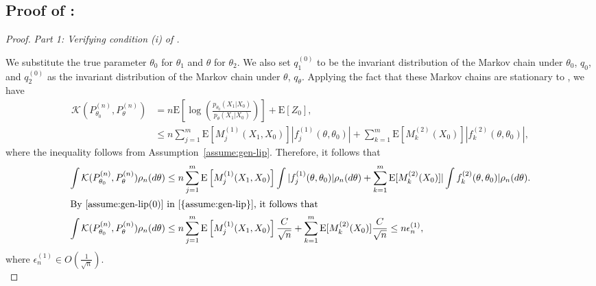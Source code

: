 \documentclass[11pt]{amsart}
\newcommand{\E}{\mathrm{E}}
\newcommand{\kld}{ \mathcal{K}(P^{(n)}_{\theta_0},P^{(n)}_{\theta})}
\begin{document}
\subsection{Proof of  : }
%
\begin{proof} 
\textit{Part 1: Verifying condition (i) of .}

We substitute the true parameter $\theta_0$  for $\theta_1$ and $\theta$ for $\theta_2$. 
We also set $q_{1}^{(0)}$ to be the invariant distribution of the Markov chain under $\theta_0$, $q_{0}$, and $q_{2}^{(0)}$ as the invariant distribution of the Markov chain under $\theta$, $q_{\theta}$. Applying the fact that these Markov chains are stationary to , we have
\begin{align}
  \kld %
   & = n \E \left[ \log\left( \frac{p_{\theta_0}(X_{1}|X_{0})}{p_{\theta}(X_{1}|X_{0})} \right) \right]+\E[Z_0],\nonumber\\
   & \leq n\sum_{j=1}^m \E\left[ M^{(1)}_j(X_1,X_{0}) \right] |f^{(1)}_j(\theta,\theta_0)|+\sum_{k=1}^m{\E [M^{(2)}_k(X_0)]|f^{(2)}_k(\theta,\theta_0)|},\label{eq:kld-bound-1}
\end{align}
where the inequality follows from Assumption~\ref{assume:gen-lip}. Therefore, it follows that
\begin{align*}
     \int \kld \rho_n(d\theta) & \leq n\sum_{j=1}^m \E\left[M^{(1)}_j(X_1,X_0)\right] \int |f^{(1)}_j(\theta,\theta_0)|\rho_n(d\theta)+\sum_{k=1}^m\E [M^{(2)}_k(X_0)]| \int f^{(2)}_k(\theta,\theta_0)|  \rho_n(d\theta).\\
     \intertext{By \cref{assume:gen-lip(0)} in \Cref{{assume:gen-lip}}, it follows that}
    \int \kld \rho_n(d\theta) & \leq n\sum_{j=1}^m \E\left[M^{(1)}_j(X_1,X_0)\right]\frac{C}{\sqrt{n}}+\sum_{k=1}^m\E [M^{(2)}_k(X_0)]\frac{C}{\sqrt{n}} \leq n \epsilon_n^{(1)},
\end{align*}
where $\epsilon_n^{(1)} \in O\left( \frac{1}{\sqrt{n}} \right)$.\\

\end{proof}
\end{document}
